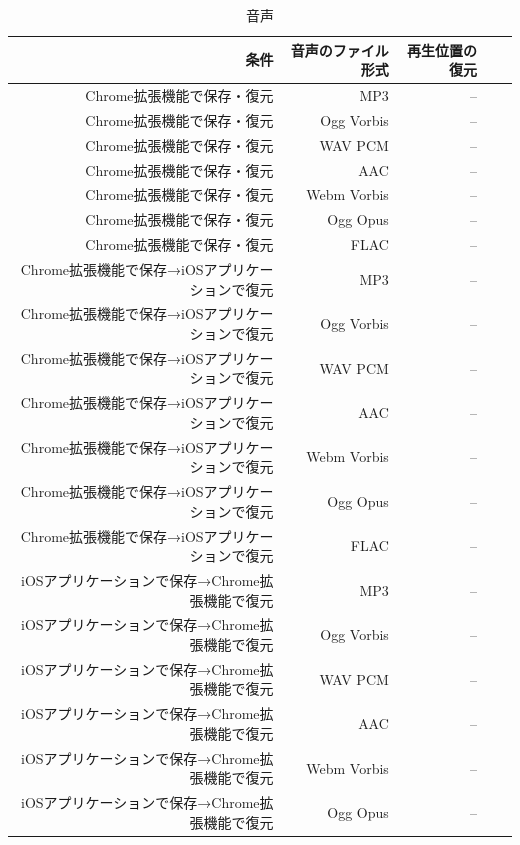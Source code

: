 \begin{table}[htbp]
  \caption{音声}
  \label{tb:evl-result-audio}
  \begin{center}
    \begin{tabular}{rrrrr}
      \hline
      条件 & 音声のファイル形式 & 再生位置の復元 \\ \hline \hline
      Chrome拡張機能で保存・復元 & MP3 & --  \\ \hline
      Chrome拡張機能で保存・復元 & Ogg Vorbis & --  \\ \hline
      Chrome拡張機能で保存・復元 & WAV PCM & --  \\ \hline
      Chrome拡張機能で保存・復元 & AAC & --  \\ \hline
      Chrome拡張機能で保存・復元 & Webm Vorbis & --  \\ \hline
      Chrome拡張機能で保存・復元 & Ogg Opus & --  \\ \hline
      Chrome拡張機能で保存・復元 & FLAC & --  \\ \hline
      Chrome拡張機能で保存→iOSアプリケーションで復元 & MP3 & --  \\ \hline
      Chrome拡張機能で保存→iOSアプリケーションで復元 & Ogg Vorbis & --  \\ \hline
      Chrome拡張機能で保存→iOSアプリケーションで復元 & WAV PCM & --  \\ \hline
      Chrome拡張機能で保存→iOSアプリケーションで復元 & AAC & --  \\ \hline
      Chrome拡張機能で保存→iOSアプリケーションで復元 & Webm Vorbis & --  \\ \hline
      Chrome拡張機能で保存→iOSアプリケーションで復元 & Ogg Opus & --  \\ \hline
      Chrome拡張機能で保存→iOSアプリケーションで復元 & FLAC & --  \\ \hline
      iOSアプリケーションで保存→Chrome拡張機能で復元 & MP3 & --  \\ \hline
      iOSアプリケーションで保存→Chrome拡張機能で復元 & Ogg Vorbis & --  \\ \hline
      iOSアプリケーションで保存→Chrome拡張機能で復元 & WAV PCM & --  \\ \hline
      iOSアプリケーションで保存→Chrome拡張機能で復元 & AAC & --  \\ \hline
      iOSアプリケーションで保存→Chrome拡張機能で復元 & Webm Vorbis & --  \\ \hline
      iOSアプリケーションで保存→Chrome拡張機能で復元 & Ogg Opus & --  \\ \hline

\end{tabular}
\end{center}
\end{table}
